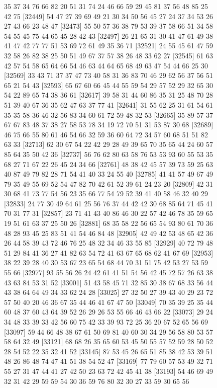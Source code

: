 \documentclass{article}
\begin{document}
\begin{figure}[H]
\begin{Schunk}
\begin{Soutput}
[32425] 35 37 34 76 66 82 20 51 31 74 24 46 66 59 29 45 81 37 56 48 85 25 42 75
[32449] 54 47 27 39 69 49 21 30 34 50 56 45 27 24 37 34 53 26 27 43 66 23 48 47
[32473] 55 50 57 36 38 79 53 39 37 58 66 51 34 58 54 55 45 75 44 65 45 28 42 43
[32497] 26 21 65 31 30 41 47 61 49 38 41 47 42 77 77 51 53 69 72 61 49 35 36 71
[32521] 24 55 45 61 47 59 32 58 26 82 38 25 50 51 49 67 37 57 38 26 48 33 62 27
[32545] 61 63 42 57 54 58 65 64 66 54 46 63 44 64 65 68 49 63 47 54 44 66 25 30
[32569] 33 43 71 37 37 47 73 40 58 31 36 83 70 46 29 62 56 37 56 51 65 21 54 43
[32593] 65 67 60 66 45 44 55 59 54 29 57 52 29 32 65 30 54 22 89 65 74 38 36 61
[32617] 39 58 31 44 60 86 35 31 25 48 70 28 51 39 40 67 36 35 62 47 63 37 77 41
[32641] 31 55 62 25 31 61 54 61 35 35 58 36 46 32 56 83 34 60 61 72 59 48 32 53
[32665] 35 89 57 37 67 67 83 48 37 38 27 58 53 78 34 19 72 70 51 31 53 87 30 68
[32689] 46 75 66 55 80 61 46 54 66 32 59 36 60 64 72 34 57 60 68 51 51 82 63 33
[32713] 62 30 67 54 22 42 29 28 49 39 65 70 35 65 44 24 60 57 85 64 35 50 42 36
[32737] 56 76 62 80 63 58 76 53 53 93 60 55 53 35 68 27 71 67 22 26 45 24 34 66
[32761] 48 38 42 45 57 39 73 59 25 63 40 87 49 79 82 28 71 54 41 40 33 24 55 40
[32785] 41 41 57 49 67 49 79 35 49 55 69 52 54 47 82 70 42 61 52 39 61 24 23 20
[32809] 42 31 30 68 41 73 77 54 56 23 35 66 77 54 79 52 39 41 40 58 46 32 40 29
[32833] 24 77 30 49 64 61 25 56 76 37 44 42 42 30 68 85 64 71 45 41 70 31 77 31
[32857] 23 71 41 43 40 86 46 30 22 57 42 46 78 35 59 65 19 51 61 63 37 25 50 26
[32881] 68 35 58 22 56 65 54 93 80 61 70 36 48 28 93 45 25 83 51 41 54 46 84 48
[32905] 42 49 42 53 48 65 42 36 26 44 58 39 43 72 46 76 25 48 32 34 46 33 55 85
[32929] 40 72 79 48 51 29 84 41 36 27 41 82 63 54 72 41 63 67 65 68 62 41 67 69
[32953] 38 22 39 28 40 30 53 67 23 65 54 68 44 70 31 51 75 42 53 27 53 59 55 66
[32977] 93 55 56 26 24 42 61 41 51 54 56 42 45 72 57 26 63 38 43 63 84 53 31 52
[33001] 51 43 58 45 71 32 85 30 38 67 68 33 56 44 43 38 64 64 49 34 33 62 24 28
[33025] 27 32 50 27 39 43 40 29 23 72 57 50 40 20 46 36 67 35 44 46 41 67 47 50
[33049] 70 35 39 25 35 44 60 48 37 60 43 64 39 52 26 29 26 53 55 66 46 43 66 22
[33073] 29 24 34 48 33 39 33 42 56 60 75 42 33 39 93 72 25 36 20 67 52 65 56 69
[33097] 59 44 66 48 38 67 61 50 69 81 40 60 30 34 29 56 58 80 53 57 58 64 32 49
[33121] 68 68 26 35 65 60 53 45 50 55 57 52 59 28 50 52 28 54 52 22 35 32 41 52
[33145] 87 53 45 26 65 51 85 38 42 53 39 51 48 26 86 48 74 47 41 51 38 54 52 47
[33169] 77 79 60 57 53 49 32 71 55 27 31 47 44 41 27 42 50 23 63 72 42 45 41 38
[33193] 54 46 69 49 32 31 42 29 59 59 54 30 36 59 76 80 32 30 27 33 59 30 65 56

\end{Soutput}
\end{Schunk}
\end{figure}
\end{document}
